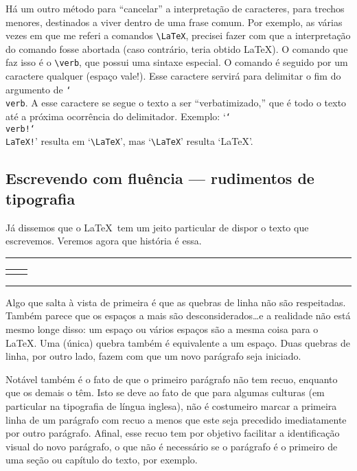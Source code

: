 Há um outro método para ``cancelar'' a interpretação de caracteres,
para trechos menores, destinados a viver dentro de uma frase
comum. Por exemplo, as várias vezes em que me referi a comandos
\verb'\LaTeX', precisei fazer com que a interpretação do comando fosse
abortada (caso contrário, teria obtido \LaTeX). O comando que faz isso
é o \verb'\verb', que possui uma sintaxe especial. O comando é seguido
por um caractere qualquer (espaço vale!). Esse caractere servirá para
delimitar o fim do argumento de \texttt{\char`\\{}verb}. A esse
caractere se segue o texto a ser ``verbatimizado,'' que é todo o texto
até a próxima ocorrência do delimitador. Exemplo:
`\texttt{\char`\\{}verb!\char`\\LaTeX!}' resulta em `\verb!\LaTeX!',
mas `\verb'\LaTeX'' resulta `\LaTeX'.

\subsection{Escrevendo com fluência --- rudimentos de tipografia}

Já dissemos que o \LaTeX\ tem um jeito particular de dispor o texto
que escrevemos. Veremos agora que história é essa.

\medskip
\noindent\begin{minipage}{\textwidth}
\begin{center}\footnotesize\hrule\smallskip
\begin{tabular}{c|c}
\begin{minipage}{.465\textwidth}

\end{minipage} &
\begin{minipage}{.465\textwidth}

\end{minipage}
\end{tabular}
\smallskip\hrule
\end{center}
\end{minipage}
\medskip

Algo que salta à vista de primeira é que as quebras de linha não são
respeitadas. Também parece que os espaços a mais são
desconsiderados\dots e a realidade não está mesmo longe disso: um
espaço ou vários espaços são a mesma coisa para o \LaTeX. Uma (única)
quebra também é equivalente a um espaço. Duas quebras de linha, por
outro lado, fazem com que um novo parágrafo seja iniciado.

Notável também é o fato de que o primeiro
parágrafo não tem recuo, enquanto que os
demais o têm. Isto se deve ao fato de que para algumas culturas (em
particular na tipografia de língua inglesa), não é costumeiro marcar a
primeira linha de um parágrafo com recuo a menos que este seja
precedido imediatamente por outro parágrafo. Afinal, esse recuo tem
por objetivo facilitar a identificação visual do novo parágrafo, o que
não é necessário se o parágrafo é o primeiro de uma seção ou capítulo
do texto, por exemplo.


